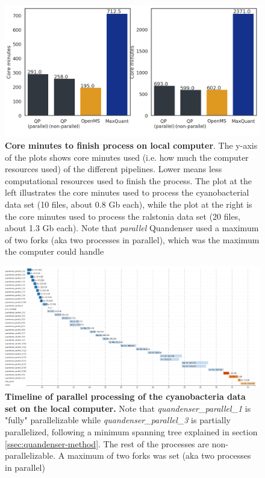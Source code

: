 \begin{figure}[H]
  \includegraphics[width=\linewidth]{results/times_core.png}
  \caption{\textbf{Core minutes to finish process on local computer}. The y-axis of the plots shows core minutes used (i.e. how much the computer resources used) of the different pipelines. Lower means less computational resources used to finish the process. The plot at the left illustrates the core minutes used to process the cyanobacterial data set (10 files, about 0.8 Gb each), while the plot at the right is the core minutes used to process the ralstonia data set (20 files, about 1.3 Gb each). Note that \textit{parallel} Quandenser used a maximum of two forks (aka two processes in parallel), which was the maximum the computer could handle}
  \label{fig:processing-local-cores}
\end{figure}


\begin{figure}[H]
  \includegraphics[width=\linewidth]{results/timeline-local.png}
  \caption{\textbf{Timeline of parallel processing of the cyanobacteria data set on the local computer.} Note that \textit{quandenser\_parallel\_1} is "fully" parallelizable while \textit{quandenser\_parallel\_3} is partially parallelized, following a minimum spanning tree explained in section \ref{ssec:quandenser-method}. The rest of the processes are non-parallelizable. A maximum of two forks was set (aka two processes in parallel)}
  \label{fig:timeline-local}
\end{figure}

